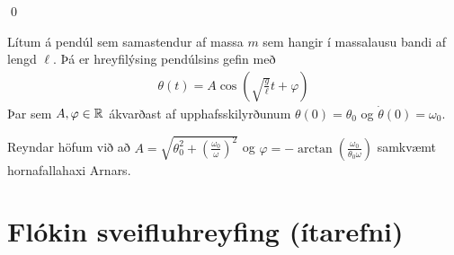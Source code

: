 \qed

\begin{tcolorbox}
\begin{theorem}
Lítum á pendúl sem samastendur af massa $m$ sem hangir í massalausu bandi af lengd $\ell$. Þá er hreyfilýsing pendúlsins gefin með
\begin{align*}
    \theta(t) = A \cos(\sqrt{\frac{g}{\ell}}t + \varphi)
\end{align*}
Þar sem $A, \varphi \in \mathbb{R}$ ákvarðast af upphafsskilyrðunum $\theta(0) = \theta_0$ og $\dot{\theta}(0) = \omega_0$.
\end{theorem}
\end{tcolorbox}
Reyndar höfum við að $A = \sqrt{\theta_0^2 + \left(\frac{\omega_0}{\omega}\right)^2}$ og $\varphi = -\arctan(\frac{\omega_0}{\theta_0 \omega})$ samkvæmt hornafallahaxi Arnars.

\section{Flókin sveifluhreyfing (ítarefni)}

